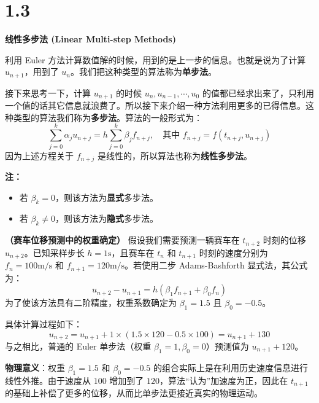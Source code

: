 \section{1.3}
\begin{definition}[多步法]
    \noindent \textbf{线性多步法 (Linear Multi-step Methods)}

\vspace{1em}

利用 Euler 方法计算数值解的时候，用到的是上一步的信息。也就是说为了计算 $u_{n+1}$，用到了 $u_n$。我们把这种类型的算法称为\textbf{单步法}。

接下来思考一下，计算 $u_{n+1}$ 的时候 $u_n, u_{n-1}, \cdots, u_0$ 的值都已经求出来了，只利用一个值的话其它信息就浪费了。所以接下来介绍一种方法利用更多的已得信息。这种类型的算法我们称为\textbf{多步法}。算法的一般形式为：
\[
\sum_{j=0}^{k} \alpha_j u_{n+j} = h \sum_{j=0}^{k} \beta_j f_{n+j}, \quad \text{其中 } f_{n+j} = f(t_{n+j}, u_{n+j})
\]
因为上述方程关于 $f_{n+j}$ 是线性的，所以算法也称为\textbf{线性多步法}。

\vspace{1em}

\noindent \textbf{注：}
\begin{itemize}
    \item 若 $\beta_k = 0$，则该方法为\textbf{显式}多步法。
    \item 若 $\beta_k \neq 0$，则该方法为\textbf{隐式}多步法。
\end{itemize}

\end{definition}
\begin{example}
    \textbf{（赛车位移预测中的权重确定）} 假设我们需要预测一辆赛车在 $t_{n+2}$ 时刻的位移 $u_{n+2}$。已知采样步长 $h=1\text{s}$，且赛车在 $t_n$ 和 $t_{n+1}$ 时刻的速度分别为 $f_n = 100\text{m/s}$ 和 $f_{n+1} = 120\text{m/s}$。若使用二步 Adams-Bashforth 显式法，其公式为：
    $$u_{n+2} - u_{n+1} = h \left( \beta_1 f_{n+1} + \beta_0 f_n \right)$$
    为了使该方法具有二阶精度，权重系数确定为 $\beta_1 = 1.5$ 且 $\beta_0 = -0.5$。
    
    具体计算过程如下：
    $$u_{n+2} = u_{n+1} + 1 \times (1.5 \times 120 - 0.5 \times 100) = u_{n+1} + 130$$
    与之相比，普通的 Euler 单步法（权重 $\beta_1=1, \beta_0=0$）预测值为 $u_{n+1} + 120$。
    
    \textbf{物理意义}：权重 $\beta_1=1.5$ 和 $\beta_0=-0.5$ 的组合实际上是在利用历史速度信息进行线性外推。由于速度从 $100$ 增加到了 $120$，算法“认为”加速度为正，因此在 $t_{n+1}$ 的基础上补偿了更多的位移，从而比单步法更接近真实的物理运动。
\end{example}
